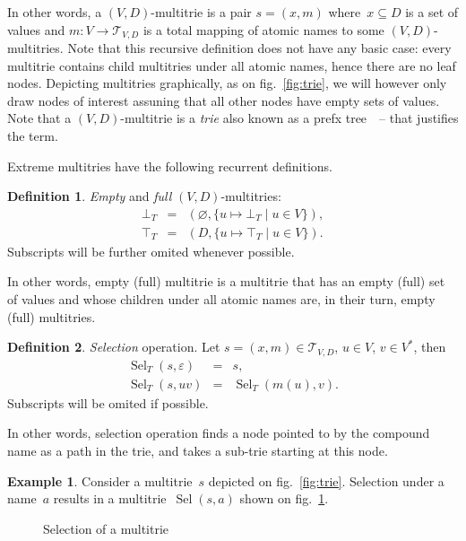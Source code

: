\documentclass{article}
\theoremstyle{definition}
\newtheorem{Df}{Definition}
\newtheorem{Ex}{Example}
\newcommand{\setcharmt}{T}
\newcommand{\setsymbol}[3]{\mathcal{#1}_{#2,#3}}
\newcommand{\setmt}[2]{\setsymbol{\setcharmt}{#1}{#2}}
\newcommand{\select}{\operatorname{Sel}}
\begin{document}
In other words, a $(V,D)$-multitrie is a pair $s = (x, m)$ where~$x\subseteq D$
is a set of values and $m: V \to \setmt{V}{D}$ is a total mapping of
atomic names to some $(V,D)$-multitries. Note that this recursive definition does
not have any basic case: every multitrie contains child multitries
under all atomic names, hence there are no leaf nodes.
Depicting multitries graphically, as on fig.~\ref{fig:trie}, we will however
only draw nodes of interest assuning that all other nodes have empty sets of
values.  Note that a $(V,D)$-multitrie is a \emph{trie} also known as
a prefx tree~\cite{bib:knuth-trie}~-- that justifies the term.

Extreme multitries have the following recurrent definitions.
\begin{Df}\label{df:mt-extreme}
\emph{Empty} and \emph{full} $(V,D)$-multitries:
\begin{eqnarray*}
  \bot_\setcharmt & = &
      ( \varnothing, \{ u \mapsto \bot_\setcharmt \mid u\in V \} ) , \\
  \top_\setcharmt & = &
      ( D,           \{ u \mapsto \top_\setcharmt \mid u\in V \} ) .
\end{eqnarray*}
Subscripts will be further omited whenever possible.
\end{Df}
In other words, empty (full) multitrie is a multitrie that has an empty
(full) set of values and whose children under all atomic names are, in their
turn, empty (full) multitries.

\begin{Df}\label{df:mt-select}
\emph{Selection} operation. Let $s=(x,m) \in \setmt{V}{D}$, $u\in V$,
$v\in V^\ast$, then
\begin{eqnarray*}
  \select_\setcharmt(s, \varepsilon) & = & s , \\
  \select_\setcharmt(s, u v) & = & \select_\setcharmt(m(u), v) .
\end{eqnarray*}
Subscripts will be omited if possible.
\end{Df}

In other words, selection operation finds a node pointed to by the
compound name as a path in the trie, and takes a sub-trie starting
at this node.

\begin{Ex}\label{ex:mt-select}
Consider a multitrie~$s$ depicted on fig.~\ref{fig:trie}. Selection under a
name~$a$ results in a multitrie~$\select(s,a)$ shown on
fig.~\ref{fig:mt-select}.
\end{Ex}

\begin{figure}[ht]
\begin{center}
\begin{minipage}{17em}
\end{minipage}
\end{center}
\caption{Selection of a multitrie}\label{fig:mt-select}
\end{figure}
\end{document}
